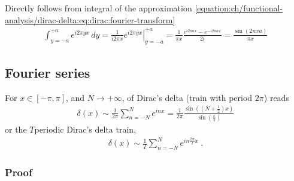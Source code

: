 \documentclass[letterpaper,10pt,english]{jupyterBook}
\begin{document}
\sphinxAtStartPar
Directly follows from integral of the approximation \eqref{equation:ch/functional-analysis/dirac-delta:eq:dirac:fourier-transform}
\begin{equation*}
\begin{split}\int_{y=-a}^{+a} e^{i 2 \pi y x} \, dy = \frac{1}{i 2 \pi x} \left. e^{i 2 \pi y x}\right|_{y=-a}^{+a} = \frac{1}{\pi x} \frac{e^{i 2 \pi a x} - e^{-i 2 \pi a x}}{2 i} = \frac{\sin(2 \pi x a)}{\pi x}\end{split}
\end{equation*}

\subsection{Fourier series}
\label{\detokenize{ch/functional-analysis/dirac-delta:fourier-series}}\label{\detokenize{ch/functional-analysis/dirac-delta:functional-analysis-dirac-delta-approximations-fourier-series}}
\sphinxAtStartPar
For \(x \in [-\pi, \pi]\), and \(N \rightarrow +\infty\), {\hyperref[\detokenize{ch/complex/fourier-series:complex-fourier-series}]{}} of Dirac’s delta (train with period \(2\pi\)) reads
\begin{equation*}
\begin{split}\delta(x) \sim \frac{1}{2\pi}\sum_{n=-N}^{N} e^{i n x} = \frac{1}{2 \pi} \frac{\sin\left(\left(N+\frac{1}{2}\right)x\right)}{\sin\left( \frac{x}{2} \right)}\end{split}
\end{equation*}
\sphinxAtStartPar
or the \(T\)\sphinxhyphen{}periodic Dirac’s delta train,
\begin{equation*}
\begin{split}\delta(x) \sim \frac{1}{T}\sum_{n=-N}^{N} e^{i n \frac{2\pi}{T} x} \ .\end{split}
\end{equation*}
\sphinxAtStartPar
{} 
\subsubsection*{Proof}
\end{document}
